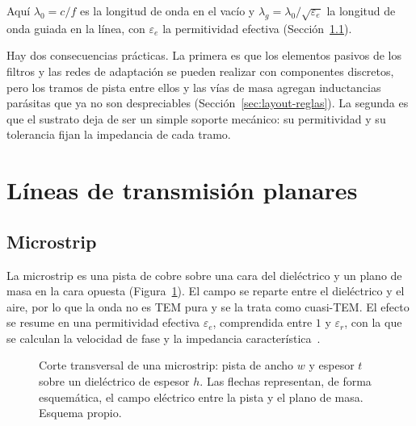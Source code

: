 Aquí $\lambda_0 = c/f$ es la longitud de onda en el vacío y $\lambda_g = \lambda_0/\sqrt{\varepsilon_e}$ la longitud de onda guiada en la línea, con $\varepsilon_e$ la permitividad efectiva (Sección~\ref{sec:layout-microstrip}).

Hay dos consecuencias prácticas. La primera es que los elementos pasivos de los filtros y las redes de adaptación se pueden realizar con componentes discretos, pero los tramos de pista entre ellos y las vías de masa agregan inductancias parásitas que ya no son despreciables (Sección~\ref{sec:layout-reglas}). La segunda es que el sustrato deja de ser un simple soporte mecánico: su permitividad y su tolerancia fijan la impedancia de cada tramo.

\section{Líneas de transmisión planares}\label{sec:layout-lineas}

\subsection{Microstrip}\label{sec:layout-microstrip}

La microstrip es una pista de cobre sobre una cara del dieléctrico y un plano de masa en la cara opuesta (Figura~\ref{fig:layout-ms}). El campo se reparte entre el dieléctrico y el aire, por lo que la onda no es TEM pura y se la trata como cuasi-TEM\@. El efecto se resume en una permitividad efectiva $\varepsilon_e$, comprendida entre $1$ y $\varepsilon_r$, con la que se calculan la velocidad de fase y la impedancia característica~\cite{pozar,steer1}.

\begin{figure}[H]
  \centering
  \caption[Corte transversal de una microstrip.]{Corte transversal de una microstrip: pista de ancho $w$ y espesor $t$ sobre un dieléctrico de espesor $h$. Las flechas representan, de forma esquemática, el campo eléctrico entre la pista y el plano de masa. Esquema propio.}\label{fig:layout-ms}
\end{figure}


